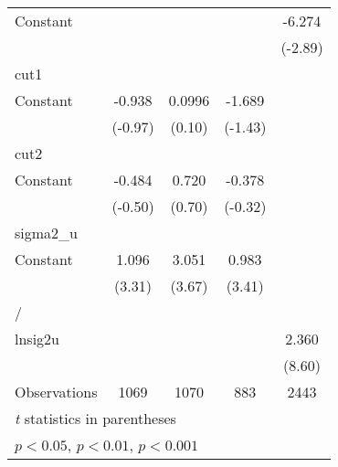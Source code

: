 {\begin{longtable}{l*{4}{c}}
\addlinespace
Constant        &                  &                  &                  &   -6.274\sym{**} \\
                &                  &                  &                  &  (-2.89)         \\
\midrule
cut1            &                  &                  &                  &                  \\
Constant        &   -0.938         &   0.0996         &   -1.689         &                  \\
                &  (-0.97)         &   (0.10)         &  (-1.43)         &                  \\
\midrule
cut2            &                  &                  &                  &                  \\
Constant        &   -0.484         &    0.720         &   -0.378         &                  \\
                &  (-0.50)         &   (0.70)         &  (-0.32)         &                  \\
\midrule
sigma2\_u        &                  &                  &                  &                  \\
Constant        &    1.096\sym{***}&    3.051\sym{***}&    0.983\sym{***}&                  \\
                &   (3.31)         &   (3.67)         &   (3.41)         &                  \\
\midrule
/               &                  &                  &                  &                  \\
lnsig2u         &                  &                  &                  &    2.360\sym{***}\\
                &                  &                  &                  &   (8.60)         \\
\midrule
Observations    &     1069         &     1070         &      883         &     2443         \\
\bottomrule
\multicolumn{5}{l}{\footnotesize \textit{t} statistics in parentheses}\\
\multicolumn{5}{l}{\footnotesize \sym{*} \(p<0.05\), \sym{**} \(p<0.01\), \sym{***} \(p<0.001\)}\\
\end{longtable}
}
